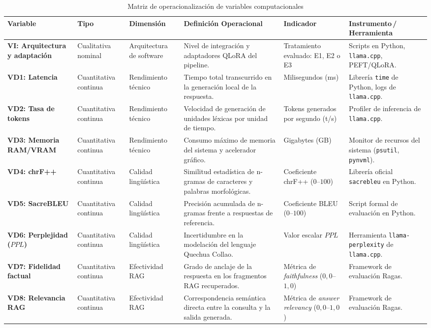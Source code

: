 \begin{table}[H]
\centering
\caption{Matriz de operacionalización de variables computacionales}
\label{tab:operacionalizacion}
\footnotesize
\begin{tabularx}{\textwidth}{@{}p{2.3cm}p{1.7cm}p{1.8cm}p{2.4cm}p{2.0cm}X@{}}
\toprule
\textbf{Variable} & \textbf{Tipo} & \textbf{Dimensión} & \textbf{Definición Operacional} & \textbf{Indicador} & \textbf{Instrumento\,/\,Herramienta} \\
\midrule
\textbf{VI: Arquitectura y adaptación} & Cualitativa nominal & Arquitectura de software & Nivel de integración y adaptadores QLoRA del pipeline. & Tratamiento evaluado: E1, E2 o E3 & Scripts en Python, \texttt{llama.cpp}, PEFT/QLoRA. \\
\midrule
\textbf{VD1: Latencia} & Cuantitativa continua & Rendimiento técnico & Tiempo total transcurrido en la generación local de la respuesta. & Milisegundos (ms) & Librería \texttt{time} de Python, logs de \texttt{llama.cpp}. \\
\midrule
\textbf{VD2: Tasa de tokens} & Cuantitativa continua & Rendimiento técnico & Velocidad de generación de unidades léxicas por unidad de tiempo. & Tokens generados por segundo (t/s) & Profiler de inferencia de \texttt{llama.cpp}. \\
\midrule
\textbf{VD3: Memoria RAM/VRAM} & Cuantitativa continua & Rendimiento técnico & Consumo máximo de memoria del sistema y acelerador gráfico. & Gigabytes (GB) & Monitor de recursos del sistema (\texttt{psutil}, \texttt{pynvml}). \\
\midrule
\textbf{VD4: chrF++} & Cuantitativa continua & Calidad lingüística & Similitud estadística de n-gramas de caracteres y palabras morfológicas. & Coeficiente chrF++ ($0$--$100$) & Librería oficial \texttt{sacrebleu} en Python. \\
\midrule
\textbf{VD5: SacreBLEU} & Cuantitativa continua & Calidad lingüística & Precisión acumulada de n-gramas frente a respuestas de referencia. & Coeficiente BLEU ($0$--$100$) & Script formal de evaluación en Python. \\
\midrule
\textbf{VD6: Perplejidad ($PPL$)} & Cuantitativa continua & Calidad lingüística & Incertidumbre en la modelación del lenguaje Quechua Collao. & Valor escalar $PPL$ & Herramienta \texttt{llama-perplexity} de \texttt{llama.cpp}. \\
\midrule
\textbf{VD7: Fidelidad factual} & Cuantitativa continua & Efectividad RAG & Grado de anclaje de la respuesta en los fragmentos RAG recuperados. & Métrica de \textit{faithfulness} ($0,0$--$1,0$) & Framework de evaluación Ragas. \\
\midrule
\textbf{VD8: Relevancia RAG} & Cuantitativa continua & Efectividad RAG & Correspondencia semántica directa entre la consulta y la salida generada. & Métrica de \textit{answer relevancy} ($0,0$--$1,0$) & Framework de evaluación Ragas. \\
\bottomrule
\end{tabularx}
\end{table}

